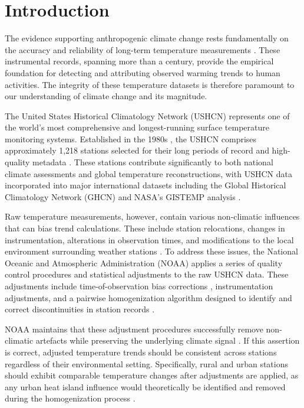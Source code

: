 \documentclass[11pt, a4paper]{article}
\begin{document}
\section{Introduction}

The evidence supporting anthropogenic climate change rests fundamentally on the accuracy and reliability of long-term temperature measurements \parencite{hansen2010global}. These instrumental records, spanning more than a century, provide the empirical foundation for detecting and attributing observed warming trends to human activities. The integrity of these temperature datasets is therefore paramount to our understanding of climate change and its magnitude.

The United States Historical Climatology Network (USHCN) represents one of the world's most comprehensive and longest-running surface temperature monitoring systems. Established in the 1980s \parencite{quinlan1987ushcn,karl1990ushcn}, the USHCN comprises approximately 1,218 stations selected for their long periods of record and high-quality metadata \parencite{menne2009ushcn}. These stations contribute significantly to both national climate assessments and global temperature reconstructions, with USHCN data incorporated into major international datasets including the Global Historical Climatology Network (GHCN) \parencite{lawrimore2011overview} and NASA's GISTEMP analysis \parencite{hansen2001gistemp}.

Raw temperature measurements, however, contain various non-climatic influences that can bias trend calculations. These include station relocations, changes in instrumentation, alterations in observation times, and modifications to the local environment surrounding weather stations \parencite{peterson2006examination,menne2010reliability}. To address these issues, the National Oceanic and Atmospheric Administration (NOAA) applies a series of quality control procedures and statistical adjustments to the raw USHCN data. These adjustments include time-of-observation bias corrections \parencite{karl1986tobs,vose2003tobs}, instrumentation adjustments, and a pairwise homogenization algorithm designed to identify and correct discontinuities in station records \parencite{menne2009homogenization}.

NOAA maintains that these adjustment procedures successfully remove non-climatic artefacts while preserving the underlying climate signal \parencite{menne2009ushcn,williams2012benchmarking}. If this assertion is correct, adjusted temperature trends should be consistent across stations regardless of their environmental setting. Specifically, rural and urban stations should exhibit comparable temperature changes after adjustments are applied, as any urban heat island influence would theoretically be identified and removed during the homogenization process \parencite{menne2009homogenization,hausfather2013quantifying}.
\end{document}
